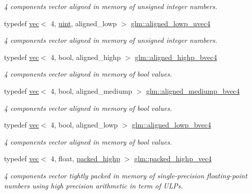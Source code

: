 \begin{DoxyCompactItemize}
\begin{DoxyCompactList}\small\item\em 4 components vector aligned in memory of unsigned integer numbers. \end{DoxyCompactList}\item 
typedef \hyperlink{structglm_1_1vec}{vec}$<$ 4, \hyperlink{group__core__precision_ga4fd29415871152bfb5abd588334147c8}{uint}, aligned\+\_\+lowp $>$ \hyperlink{group__gtc__type__aligned_ga4d1ee133cfc4f795052958ffab70d746}{glm\+::aligned\+\_\+lowp\+\_\+uvec4}
\begin{DoxyCompactList}\small\item\em 4 components vector aligned in memory of unsigned integer numbers. \end{DoxyCompactList}\item 
typedef \hyperlink{structglm_1_1vec}{vec}$<$ 4, bool, aligned\+\_\+highp $>$ \hyperlink{group__gtc__type__aligned_ga833e4cd7402677f8ca56795a12d8bec0}{glm\+::aligned\+\_\+highp\+\_\+bvec4}
\begin{DoxyCompactList}\small\item\em 4 components vector aligned in memory of bool values. \end{DoxyCompactList}\item 
typedef \hyperlink{structglm_1_1vec}{vec}$<$ 4, bool, aligned\+\_\+mediump $>$ \hyperlink{group__gtc__type__aligned_gaa5fba8713e0381efe85996169fbc2bcc}{glm\+::aligned\+\_\+mediump\+\_\+bvec4}
\begin{DoxyCompactList}\small\item\em 4 components vector aligned in memory of bool values. \end{DoxyCompactList}\item 
typedef \hyperlink{structglm_1_1vec}{vec}$<$ 4, bool, aligned\+\_\+lowp $>$ \hyperlink{group__gtc__type__aligned_ga7584318e96ebbf1e7649a7af7724ecca}{glm\+::aligned\+\_\+lowp\+\_\+bvec4}
\begin{DoxyCompactList}\small\item\em 4 components vector aligned in memory of bool values. \end{DoxyCompactList}\item 
typedef \hyperlink{structglm_1_1vec}{vec}$<$ 4, float, \hyperlink{namespaceglm_a36ed105b07c7746804d7fdc7cc90ff25a8e8791ee77fe079b1291f710d88031bf}{packed\+\_\+highp} $>$ \hyperlink{group__gtc__type__aligned_gabbc42b2b5ad854c60821526c4e291161}{glm\+::packed\+\_\+highp\+\_\+vec4}
\begin{DoxyCompactList}\small\item\em 4 components vector tightly packed in memory of single-\/precision floating-\/point numbers using high precision arithmetic in term of U\+L\+Ps. \end{DoxyCompactList}\item 

\end{DoxyCompactItemize}
